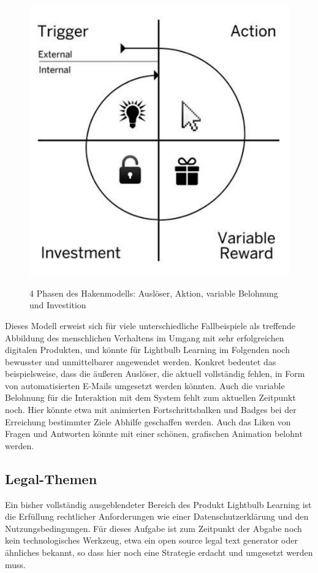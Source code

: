 \begin{figure}[H]
    \centering
    \includegraphics[width = .6\textwidth]{images/hook.png}
    \caption{4 Phasen des Hakenmodells: Auslöser, Aktion, variable Belohnung und Investition} \cite[S. 9]{Eyal2014}
    \label{fig:hooks}
\end{figure}

\noindent Dieses Modell erweist sich für viele unterschiedliche Fallbeispiele als treffende Abbildung des menschlichen Verhaltens im Umgang mit sehr erfolgreichen digitalen Produkten, und könnte für Lightbulb Learning im Folgenden noch bewusster und unmittelbarer angewendet werden. Konkret bedeutet das beispielsweise, dass die äußeren Auslöser, die aktuell vollständig fehlen, in Form von automatisierten E-Mails umgesetzt werden könnten. Auch die variable Belohnung für die Interaktion mit dem System fehlt zum aktuellen Zeitpunkt noch. Hier könnte etwa mit animierten Fortschrittsbalken und Badges bei der Erreichung bestimmter Ziele Abhilfe geschaffen werden. Auch das Liken von Fragen und Antworten könnte mit einer schönen, grafischen Animation belohnt werden.

\subsection{Legal-Themen}
Ein bisher vollständig ausgeblendeter Bereich des Produkt Lightbulb Learning ist die Erfüllung rechtlicher Anforderungen wie einer Datenschutzerklärung und den Nutzungsbedingungen. Für dieses Aufgabe ist zum Zeitpunkt der Abgabe noch kein technologisches Werkzeug, etwa ein open source legal text generator oder ähnliches bekannt, so dass hier noch eine Strategie erdacht und umgesetzt werden muss.

